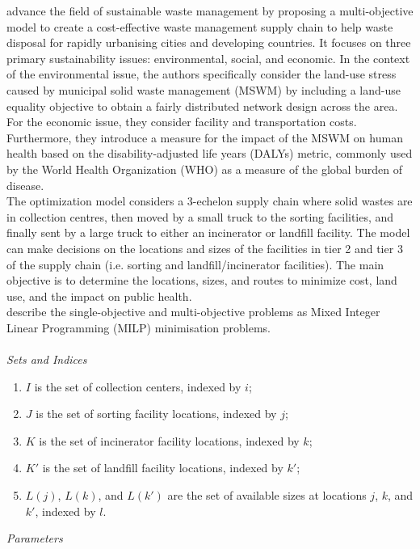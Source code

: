 \documentclass[mscthesis, 11pt]{usiinfthesis}
\theoremstyle{newdefinition}
\begin{document}
\cite{olapiriyakul_multiobjective_2019} advance the field of sustainable waste management by proposing a multi-objective model to create a cost-effective waste management supply chain to help waste disposal for rapidly urbanising cities and developing countries. It focuses on three primary sustainability issues: environmental, social, and economic. In the context of the environmental issue, the authors specifically consider the land-use stress caused by municipal solid waste management (MSWM) by including a land-use equality objective to obtain a fairly distributed network design across the area. For the economic issue, they consider facility and transportation costs. Furthermore, they introduce a measure for the impact of the MSWM on human health based on the disability-adjusted life years (DALYs) metric, commonly used by the World Health Organization (WHO) as a measure of the global burden of disease.\\
The optimization model considers a 3-echelon supply chain where solid wastes are in collection centres, then moved by a small truck to the sorting facilities, and finally sent by a large truck to either an incinerator or landfill facility. The model can make decisions on the locations and sizes of the facilities in tier 2 and tier 3 of the supply chain (i.e. sorting and landfill/incinerator facilities). The main objective is to determine the locations, sizes, and routes to minimize cost, land use, and the impact on public health. \\
\cite{olapiriyakul_multiobjective_2019} describe the single-objective and multi-objective problems as Mixed Integer Linear Programming (MILP) minimisation problems.
\\
\\
\textit{Sets and Indices}
\begin{enumerate}[label=\alph*)]
\item $I$ is the set of collection centers, indexed by $i$;
\item $J$ is the set of sorting facility locations, indexed by $j$;
\item $K$ is the set of incinerator facility locations, indexed by $k$;
\item $K'$ is the set of landfill facility locations, indexed by $k'$;
\item $L(j)$, $L(k)$, and $L(k')$ are the set of available sizes at locations $j$, $k$, and $k'$, indexed by $l$.
\end{enumerate}
\textit{Parameters}
\end{document}

